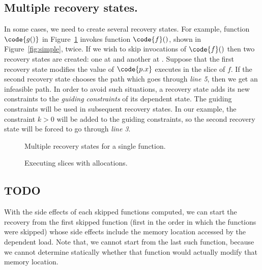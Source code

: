 

\subsection{Multiple recovery states.} 
In some cases, we need to create
several recovery states. 
For example, function $\code{g()}$ in Figure~\ref{fig:multiple-recoveries} 
invokes function $\code{f}()$, shown in Figure~\ref{fig:simple}, twice.
If we wish to skip invocations of $\code{f}()$ then
two recovery states are created:
one at  and another at .  Suppose that
the first recovery state modifies the value of $\code{p.x}$ executes  in the slice of $f$.
If the second recovery state chooses the path which goes through
\textit{line 5}, then we get an infeasible path.  In order to avoid
such situations, a recovery state adds its new constraints to the
\textit{guiding constraints} of its dependent state.  The guiding
constraints will be used in subsequent recovery states.  In our
example, the constraint $k > 0$ will be added to the guiding
constraints, so the second recovery state will be forced to go through
\textit{line 3}.


\begin{figure}[tbp]
  
\caption{Multiple recovery states for a single function.}
\label{fig:multiple-recoveries}
\end{figure}

\begin{figure}[tbp]
  
\caption{Executing slices with allocations.}
\label{fig:slices-with-allocations}
\end{figure}





\subsection{TODO}

With the side effects of each skipped functions computed, we can start
the recovery from the first skipped function (first in the order in
which the functions were skipped) whose side effects include the
memory location accessed by the dependent load.  Note that, we cannot
start from the last such function, because we cannot determine
statically whether that function would actually modify that memory
location.



